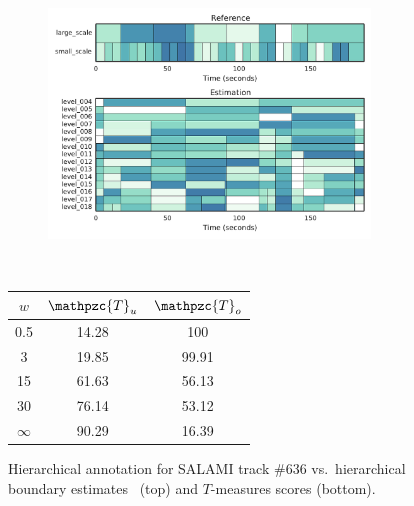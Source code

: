 \documentclass{article}
\def\shag{\ensuremath{\mathpzc{T}}}
\begin{document}
\begin{figure}[t]
  \centering
  \begin{subfigure}{0.5\textwidth}
    \centering
    \includegraphics[width=0.94\textwidth]{figs/SALAMI-OLDA.pdf}
  \end{subfigure}%
  \\
  \begin{minipage}{0.5\textwidth}
    \centering
    \vspace{10pt}
    \begin{tabular}{|c|c|c|}
      \hline
      $w$       & $\shag_u$       & $\shag_o$      \\
      \hline
      0.5       & 14.28       & 100      \\     
      3         & 19.85       & 99.91      \\
      15        & 61.63       & 56.13    \\
      30        & 76.14       & 53.12    \\
      $\infty$  & 90.29       & 16.39    \\
      \hline
    \end{tabular}
  \end{minipage}
  \caption{Hierarchical annotation for SALAMI track \#636 vs.\ hierarchical boundary
  estimates~\cite{McFee2014} (top) and $T$-measures scores (bottom).}
  \label{fig:SALAMI-OLDA}
\end{figure}


\end{document}
